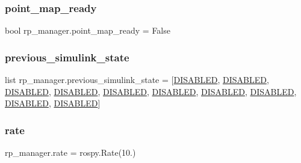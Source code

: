 \mbox{\label{namespacerp__manager_a4eb11cbe8e6db21cbbf9855db440635c}} 
\subsubsection{\texorpdfstring{point\+\_\+map\+\_\+ready}{point\_map\_ready}}
{\footnotesize\ttfamily bool rp\+\_\+manager.\+point\+\_\+map\+\_\+ready = False}

\mbox{\label{namespacerp__manager_a5071f53ee23fdca3994006206cbcf2ee}} 
\subsubsection{\texorpdfstring{previous\+\_\+simulink\+\_\+state}{previous\_simulink\_state}}
{\footnotesize\ttfamily list rp\+\_\+manager.\+previous\+\_\+simulink\+\_\+state = \mbox{[}\hyperlink{namespacerp__manager_af85e17f72f768eba5168eba56041bd69}{D\+I\+S\+A\+B\+L\+ED}, \hyperlink{namespacerp__manager_af85e17f72f768eba5168eba56041bd69}{D\+I\+S\+A\+B\+L\+ED}, \hyperlink{namespacerp__manager_af85e17f72f768eba5168eba56041bd69}{D\+I\+S\+A\+B\+L\+ED}, \hyperlink{namespacerp__manager_af85e17f72f768eba5168eba56041bd69}{D\+I\+S\+A\+B\+L\+ED}, \hyperlink{namespacerp__manager_af85e17f72f768eba5168eba56041bd69}{D\+I\+S\+A\+B\+L\+ED}, \hyperlink{namespacerp__manager_af85e17f72f768eba5168eba56041bd69}{D\+I\+S\+A\+B\+L\+ED}, \hyperlink{namespacerp__manager_af85e17f72f768eba5168eba56041bd69}{D\+I\+S\+A\+B\+L\+ED}, \hyperlink{namespacerp__manager_af85e17f72f768eba5168eba56041bd69}{D\+I\+S\+A\+B\+L\+ED}, \hyperlink{namespacerp__manager_af85e17f72f768eba5168eba56041bd69}{D\+I\+S\+A\+B\+L\+ED}, \hyperlink{namespacerp__manager_af85e17f72f768eba5168eba56041bd69}{D\+I\+S\+A\+B\+L\+ED}\mbox{]}}

\mbox{\label{namespacerp__manager_a356ae7e0a3da8c3f6d968b297f09cf8a}} 
\subsubsection{\texorpdfstring{rate}{rate}}
{\footnotesize\ttfamily rp\+\_\+manager.\+rate = rospy.\+Rate(10.)}

